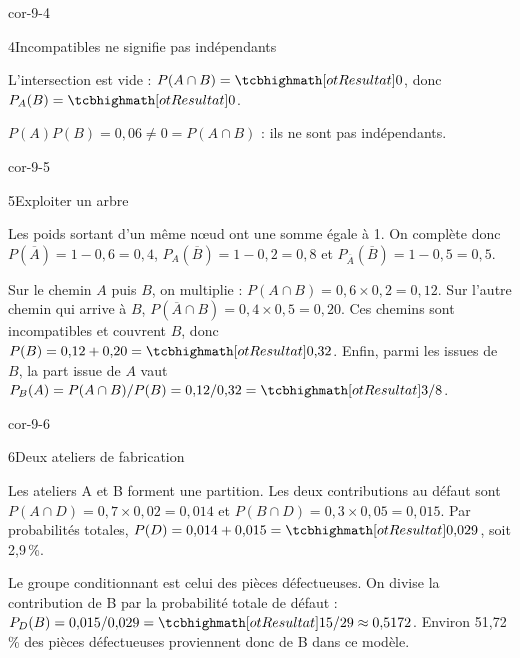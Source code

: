 \begin{blocLivre}{cor-9-4}
\begin{corrige}{4}{Incompatibles ne signifie pas indépendants}
\begin{questions}
\item L’intersection est vide : $P(A\cap B)=\res{0}$, donc $P_A(B)=\res{0}$.
\item $P(A)P(B)=0{,}06\neq0=P(A\cap B)$ : ils ne sont pas indépendants.
\end{questions}
\end{corrige}
\end{blocLivre}
\begin{blocLivre}{cor-9-5}
\begin{corrige}{5}{Exploiter un arbre}
\begin{questions}
\item Les poids sortant d’un même nœud ont une somme égale à 1.
On complète donc $P(\overline A)=1-0{,}6=0{,}4$,
$P_A(\overline B)=1-0{,}2=0{,}8$ et $P_{\overline A}(\overline B)=1-0{,}5=0{,}5$.
\item Sur le chemin $A$ puis $B$, on multiplie : $P(A\cap B)=0{,}6\times0{,}2=0{,}12$.
Sur l’autre chemin qui arrive à $B$, $P(\overline A\cap B)=0{,}4\times0{,}5=0{,}20$.
Ces chemins sont incompatibles et couvrent $B$, donc $P(B)=0{,}12+0{,}20=\res{0{,}32}$.
Enfin, parmi les issues de $B$, la part issue de $A$ vaut
$P_B(A)=P(A\cap B)/P(B)=0{,}12/0{,}32=\res{3/8}$.
\end{questions}

\label{figlivre-r09-05-cor}

\end{corrige}
\end{blocLivre}
\begin{blocLivre}{cor-9-6}
\begin{corrige}{6}{Deux ateliers de fabrication}
\begin{questions}
\item Les ateliers A et B forment une partition. Les deux contributions au défaut sont
$P(A\cap D)=0{,}7\times0{,}02=0{,}014$ et $P(B\cap D)=0{,}3\times0{,}05=0{,}015$.
Par probabilités totales, $P(D)=0{,}014+0{,}015=\res{0{,}029}$, soit 2,9\,\%.
\item Le groupe conditionnant est celui des pièces défectueuses.
On divise la contribution de B par la probabilité totale de défaut :
$P_D(B)=0{,}015/0{,}029=\res{15/29\approx0{,}5172}$.
Environ 51,72\,\% des pièces défectueuses proviennent donc de B dans ce modèle.
\end{questions}

\label{figlivre-r09-06-cor}

\end{corrige}
\end{blocLivre}
